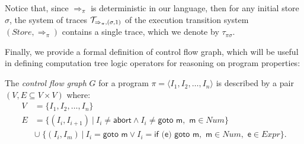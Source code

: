 \noindent Notice that, since $\Rightarrow_{\pi}$ is deterministic in our language, then for any initial store $\sigma$, the system of traces ${\cal T}_{\Rightarrow_{\pi},(\sigma,1)}$ of the execution transition system $(Store,\Rightarrow_{\pi})$ contains a single trace, which we denote by $\tau_{\pi\sigma}$.

Finally, we provide a formal definition of control flow graph, which will be useful in defining computation tree logic operators for reasoning on program properties:

\begin{definition}
\label{de:cfg}
The {\em control flow graph} $G$ for a program $\pi=\langle I_1, I_2, \ldots, I_n \rangle$ is described by a pair $(V, E \subseteq V\times V)$ where:
\begin{align*}
V &= \{ I_1, I_2, \ldots, I_n \} \\
E &= \{(I_i, I_{i+1})\:|\: I_i \neq \textsf{abort} \wedge I_i \neq \textsf{goto m}, \!\textsf{ m}\in Num \} \\
&\cup\;\{(I_i, I_m)\:|\: I_i = \textsf{goto m} \vee I_i = \textsf{if (e) goto m}, \!\textsf{ m}\in Num, \!\textsf{ e}\in Expr \}.
\end{align*}
\end{definition}
